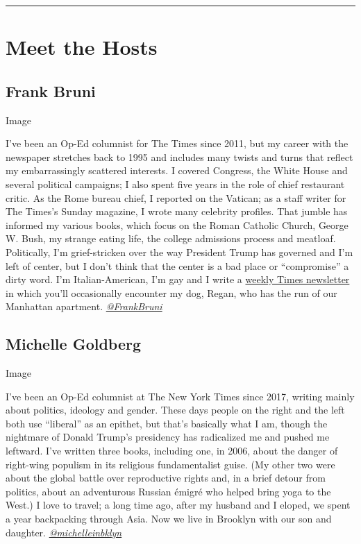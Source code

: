 \begin{center}\rule{0.5\linewidth}{\linethickness}\end{center}

\hypertarget{meet-the-hosts}{%
\section{Meet the Hosts}\label{meet-the-hosts}}

\hypertarget{frank-bruni}{%
\subsection{Frank Bruni}\label{frank-bruni}}

Image

I've been an Op-Ed columnist for The Times since 2011, but my career
with the newspaper stretches back to 1995 and includes many twists and
turns that reflect my embarrassingly scattered interests. I covered
Congress, the White House and several political campaigns; I also spent
five years in the role of chief restaurant critic. As the Rome bureau
chief, I reported on the Vatican; as a staff writer for The Times's
Sunday magazine, I wrote many celebrity profiles. That jumble has
informed my various books, which focus on the Roman Catholic Church,
George W. Bush, my strange eating life, the college admissions process
and meatloaf. Politically, I'm grief-stricken over the way President
Trump has governed and I'm left of center, but I don't think that the
center is a bad place or ``compromise'' a dirty word. I'm
Italian-American, I'm gay and I write a
\href{https://www.nytimes3xbfgragh.onion/newsletters/frank-bruni}{weekly
Times newsletter} in which you'll occasionally encounter my dog, Regan,
who has the run of our Manhattan apartment.
\href{https://twitter.com/FrankBruni}{\emph{@FrankBruni}}

\hypertarget{michelle-goldberg}{%
\subsection{Michelle Goldberg}\label{michelle-goldberg}}

Image

I've been an Op-Ed columnist at The New York Times since 2017, writing
mainly about politics, ideology and gender. These days people on the
right and the left both use ``liberal'' as an epithet, but that's
basically what I am, though the nightmare of Donald Trump's presidency
has radicalized me and pushed me leftward. I've written three books,
including one, in 2006, about the danger of right-wing populism in its
religious fundamentalist guise. (My other two were about the global
battle over reproductive rights and, in a brief detour from politics,
about an adventurous Russian émigré who helped bring yoga to the West.)
I love to travel; a long time ago, after my husband and I eloped, we
spent a year backpacking through Asia. Now we live in Brooklyn with our
son and daughter.
\href{https://twitter.com/michelleinbklyn}{\emph{@michelleinbklyn}}


